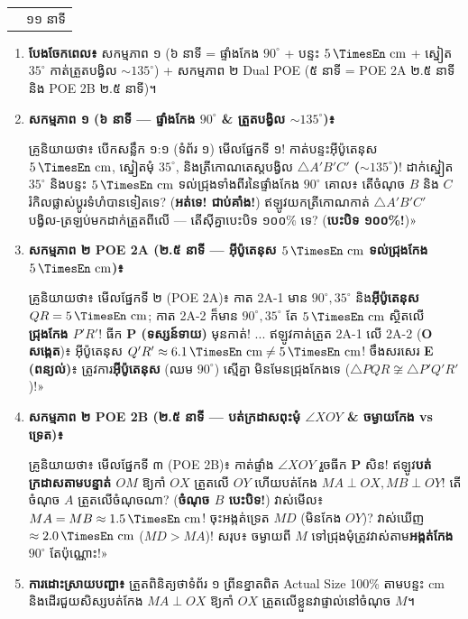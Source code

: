 \documentclass[a4paper,12pt]{article}
\makeatletter
\newcommand{\en}[1]{{\TimesEn #1}}
\newcommand{\enbf}[1]{{\TimesEn\textbf{#1}}}
\newcommand{\unit}[1]{\,\text{\en{#1}}}
\newcommand{\tri}[1]{\ensuremath{\triangle #1}}
\newcommand{\ang}[1]{\ensuremath{\angle #1}}
\newcommand{\ncg}{\ensuremath{\not\cong}}
\newenvironment{phasebox}[3]{%
  \par\needspace{2.4cm}%
  \begin{tcolorbox}[
    enhanced, sharp corners, colback=headgray, colframe=black,
    boxrule=1.0pt, top=3.5pt, bottom=3.5pt, left=8pt, right=8pt,
    before skip=5pt, after skip=3pt
  ]
    \linespread{1.0}\selectfont\renewcommand{\arraystretch}{1.0}%
    \begin{tabular*}{\linewidth}{@{}>{\raggedright\arraybackslash}p{13.10cm}@{\extracolsep{\fill}}r@{}}
      {\muol\fontsize{11pt}{14.5pt}\selectfont #1} & {\fontsize{10.5pt}{13.5pt}\selectfont\en{#2 |} #3}%
    \end{tabular*}%
  \end{tcolorbox}%
  \begingroup\fontsize{11.5pt}{14.92pt}\selectfont
}{%
  \par\endgroup
  \vspace{3pt}{\color{black}\hrule height 0.75pt}\vspace{5pt}%
}
\makeatother
\begin{document}
\begin{phasebox}{ជំហានទី ៣ \enbf{(}ក\enbf{) --- E2 Explore}៖ ផ្ទាំងកែង \enbf{1:1 \& Dual POE 2A--2B}}{11--22 min}{១១ នាទី}
  \begin{enumerate}[leftmargin=0.45cm, topsep=1.5pt, itemsep=2.2pt, parsep=0pt]
    \item \textbf{បែងចែកពេល៖} សកម្មភាព ១ (៦ នាទី = ផ្ទាំងកែង $90^\circ$ + បន្ទះ $5\unit{cm}$ + ស្នៀត $35^\circ$ កាត់ត្រួតបង្វិល $\sim 135^\circ$) + សកម្មភាព ២ \en{Dual POE} (៥ នាទី = \en{POE 2A} ២.៥ នាទី និង \en{POE 2B} ២.៥ នាទី)។
    \item \textbf{សកម្មភាព ១ (៦ នាទី — ផ្ទាំងកែង $90^\circ$ \& ត្រួតបង្វិល $\sim 135^\circ$)៖}
      \begin{scriptbox}
        {\muol\fontsize{10.8pt}{14.5pt}\selectfont \enbf{«}គ្រូនិយាយថា៖} បើកសន្លឹក ១:១ (ទំព័រ ១) មើលផ្នែកទី ១! កាត់បន្ទះអ៊ីប៉ូតេនុស \textbf{$5\unit{cm}$}, ស្នៀតមុំ \textbf{$35^\circ$}, និងត្រីកោណតេស្តបង្វិល \textbf{$\tri{A'B'C'}$ ($\sim 135^\circ$)}! ដាក់ស្នៀត $35^\circ$ និងបន្ទះ $5\unit{cm}$ ទល់ជ្រុងទាំងពីរនៃផ្ទាំងកែង $90^\circ$ គោល៖ តើចំណុច $B$ និង $C$ រំកិលផ្លាស់ប្តូរទំហំបានទៀតទេ? (\textbf{អត់ទេ! ជាប់គាំង!}) ឥឡូវយកត្រីកោណកាត់ $\tri{A'B'C'}$ បង្វិល-ត្រឡប់មកដាក់ត្រួតពីលើ — តើស៊ីគ្នាបេះបិទ ១០០\% ទេ? (\textbf{បេះបិទ ១០០\%!})»
      \end{scriptbox}
    \item \textbf{សកម្មភាព ២ \en{POE 2A} (២.៥ នាទី — អ៊ីប៉ូតេនុស $5\unit{cm}$ ទល់ជ្រុងកែង $5\unit{cm}$)៖}
      \begin{scriptbox}
        {\muol\fontsize{10.8pt}{14.5pt}\selectfont \enbf{«}គ្រូនិយាយថា៖} មើលផ្នែកទី ២ (\en{POE 2A})៖ កាត \en{2A-1} មាន $90^\circ, 35^\circ$ និង\textbf{អ៊ីប៉ូតេនុស $QR=5\unit{cm}$}; កាត \en{2A-2} ក៏មាន $90^\circ, 35^\circ$ តែ $5\unit{cm}$ ស្ថិតលើ\textbf{ជ្រុងកែង $P'R'$}! ធីក \textbf{\en{P} (ទស្សន៍ទាយ)} មុនកាត់! ... ឥឡូវកាត់ត្រួត \en{2A-1} លើ \en{2A-2} (\textbf{\en{O} សង្កេត})៖ អ៊ីប៉ូតេនុស $Q'R' \approx 6.1\unit{cm} \neq 5\unit{cm}$! ចឹងសរសេរ \textbf{\en{E} (ពន្យល់)}៖ ត្រូវការ\textbf{អ៊ីប៉ូតេនុស} (ឈម $90^\circ$) ស្មើគ្នា មិនមែនជ្រុងកែងទេ ($\tri{PQR}\ncg\tri{P'Q'R'}$)!»
      \end{scriptbox}
    \item \textbf{សកម្មភាព ២ \en{POE 2B} (២.៥ នាទី — បត់ក្រដាសពុះមុំ $\ang{XOY}$ \& ចម្ងាយកែង vs ទ្រេត)៖}
      \begin{scriptbox}
        {\muol\fontsize{10.8pt}{14.5pt}\selectfont \enbf{«}គ្រូនិយាយថា៖} មើលផ្នែកទី ៣ (\en{POE 2B})៖ កាត់ផ្ទាំង $\ang{XOY}$ រួចធីក \textbf{\en{P}} សិន! ឥឡូវ\textbf{បត់ក្រដាសតាមបន្ទាត់ $OM$} ឱ្យកាំ $OX$ ត្រួតលើ $OY$ ហើយបត់កែង $MA\perp OX, MB\perp OY$! តើចំណុច $A$ ត្រួតលើចំណុចណា? (\textbf{ចំណុច $B$ បេះបិទ!}) វាស់មើល៖ $MA = MB \approx 1.5\unit{cm}$! ចុះអង្កត់ទ្រេត $MD$ (មិនកែង $OY$)? វាស់ឃើញ $\approx 2.0\unit{cm}$ ($MD > MA$)! សរុប៖ ចម្ងាយពី $M$ ទៅជ្រុងមុំត្រូវវាស់តាម\textbf{អង្កត់កែង $90^\circ$} តែប៉ុណ្ណោះ!»
      \end{scriptbox}
    \item \textbf{ការដោះស្រាយបញ្ហា៖} ត្រួតពិនិត្យថាទំព័រ ១ ព្រីនខ្នាតពិត \en{Actual Size 100\%} តាមបន្ទះ \en{5 cm} និងដើរជួយសិស្សបត់កែង $MA\perp OX$ ឱ្យកាំ $OX$ ត្រួតលើខ្លួនវាផ្ទាល់នៅចំណុច $M$។
  \end{enumerate}
\end{phasebox}
\end{document}
